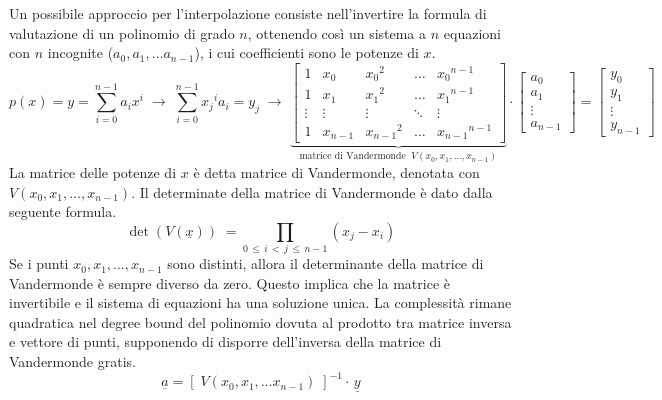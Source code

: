 Un possibile approccio per l'interpolazione consiste nell'invertire la formula di valutazione di un polinomio di grado
\(n\), ottenendo così un sistema a \(n\) equazioni con \(n\) incognite (\(a_0, a_1, \dots a_{n-1}\)), i cui coefficienti
sono le potenze di \(x\).
\[p(x) = y = \sum_{i=0}^{n-1} a_i x^i \; \rightarrow \; \sum_{i=0}^{n-1} {x_j}^i a_i = y_j \; \rightarrow \; \underbrace{\begin{bmatrix}
	1 & x_0 & {x_0}^2 & \dots & {x_0}^{n-1} \\
	1 & x_1 & {x_1}^2 & \dots & {x_1}^{n-1} \\
	\vdots & \vdots & \vdots & \ddots & \vdots \\
	1 & x_{n-1} & {x_{n-1}}^2 & \dots & {x_{n-1}}^{n-1}
\end{bmatrix}}_{\text{matrice di Vandermonde} \;\; V(x_0, x_1, \dotsc, x_{n-1})} \cdot \begin{bmatrix}
	a_0 \\ a_1 \\ \vdots \\ a_{n-1}
\end{bmatrix} = \begin{bmatrix}
	y_0 \\ y_1 \\ \vdots \\ y_{n-1}
\end{bmatrix}\]
La matrice delle potenze di \(x\) è detta matrice di Vandermonde, denotata con \(V(x_0, x_1, \dots, x_{n-1})\). Il determinate
della matrice di Vandermonde è dato dalla seguente formula.
\[\det \left( V (\underline{x}) \right) \; = \prod_{0 \, \leq \, i \, < \, j \, \leq \, n-1} (x_j - x_i) \]
Se i punti \(x_0, x_1, \dotsc, x_{n-1}\) sono distinti, allora il determinante della matrice di Vandermonde è sempre
diverso da zero. Questo implica che la matrice è invertibile e il sistema di equazioni ha una soluzione unica. La complessità
rimane quadratica nel degree bound del polinomio dovuta al prodotto tra matrice inversa e vettore di punti, supponendo di
disporre dell'inversa della matrice di Vandermonde gratis.
\[\underline{a} = \left[ \; V(x_0, x_1, \dots x_{n-1}) \; \right]^{-1} \cdot \, \underline{y}\]


